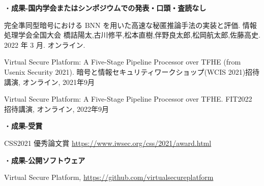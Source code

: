 \noindent・\textbf{成果-国内学会またはシンポジウムでの発表・口頭・査読なし}
\begin{enumerate}[label={[\arabic*]},leftmargin=0.5cm]
    \setcounter{enumi}{4}
    \setlength{\parskip}{0cm} %
    \setlength{\itemsep}{0cm} %
     \item  完全準同型暗号における BNN を用いた高速な秘匿推論手法の実装と評価. 情報処理学会全国大会 橋詰陽太,古川修平,松本直樹,伴野良太郎,松岡航太郎,佐藤高史. 2022 年 3 月. オンライン.\label{achieve:bnn}
	\item  Virtual Secure Platform: A Five-Stage Pipeline Processor over TFHE (from Usenix Security 2021). 暗号と情報セキュリティワークショップ(WCIS 2021)招待講演, オンライン, 2021年9月 \label{achieve:wcis}
	\item  Virtual Secure Platform: A Five-Stage Pipeline Processor over TFHE. FIT2022 招待講演, オンライン, 2022年9月\label{achieve:fit}
\end{enumerate}


\noindent・\textbf{成果-受賞}
\begin{enumerate}[label={[\arabic*]},leftmargin=0.5cm]
    \setcounter{enumi}{7}
    \setlength{\parskip}{0cm} %
    \setlength{\itemsep}{0cm} %
	\label{achieve:mitou}
	\label{achieve:nhk}
	\label{achieve:vsp}
	\item CSS2021 優秀論文賞 \url{https://www.iwsec.org/css/2021/award.html} \label{achieve:css}
\end{enumerate}


・\noindent\textbf{成果-公開ソフトウェア}
\begin{enumerate}[label={[\arabic*]},leftmargin=0.5cm]
    \setcounter{enumi}{11}
    \setlength{\parskip}{0cm} %
    \setlength{\itemsep}{0cm} %
	\item Virtual Secure Platform, \url{https://github.com/virtualsecureplatform}\label{code:vsp}
\end{enumerate}

